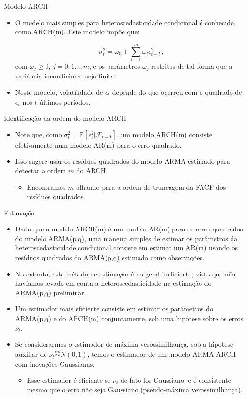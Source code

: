 \documentclass[11pt]{beamer}
\begin{document}
\begin{frame}{Modelo ARCH}
\begin{itemize}
	\item O modelo mais simples para heteroscedasticidade condicional é conhecido como {\color{blue}ARCH(m)}. Este modelo impõe que:
	
	$$\sigma^2_t = \omega_0 +\sum_{l=1}^m \omega_l \epsilon_{t-l}^2 \, ,$$
	com $\omega_j \geq 0$, $j=0,1\ldots, m$, e os parâmetros  $\omega_j$ restritos de tal forma que a variância incondicional seja finita.
	\item Neste modelo, volatilidade de $\epsilon_t$ depende do que ocorreu com o quadrado  de $\epsilon_t$ nos $t$ últimos períodos.
	
\end{itemize}
\end{frame}

\begin{frame}{Identificação da ordem do modelo ARCH}
	\begin{itemize}
		\item Note que, como $\sigma^2_t= \mathbb{E}[\epsilon^2_t|\mathcal{F}_{t-1}]$, um modelo ARCH(m) consiste efetivamente num modelo AR(m) para o erro quadrado.
		\item Isso sugere usar os resíduos quadrados do modelo ARMA estimado para detectar  a ordem $m$ do ARCH.
		\begin{itemize}
			\item Encontramos $m$ olhando para a ordem de truncagem da FACP dos resíduos quadrados.
		\end{itemize}
	\end{itemize}
\end{frame}

\begin{frame}{Estimação}
\begin{itemize}
	\item Dado que o modelo ARCH(m) é um modelo AR(m) para os erros quadrados do modelo ARMA(p,q), uma maneira simples de estimar os parâmetros da heteroscedasticidade condicional consiste em estimar um AR(m) usando os resíduos quadrados do ARMA(p,q) estimado como observações.
	\item No entanto, este método de estimação é no geral ineficiente, visto que não havíamos levado em conta a heteroscedasticidade na estimação do ARMA(p,q) preliminar.
	\item Um estimador mais eficiente consiste em estimar os parâmetros do ARMA(p,q) e do ARCH(m) {\color{blue}conjuntamente}, sob uma hipótese sobre os erros $\nu_t$.
	\item Se considerarmos o estimador de máxima verossimilhança, sob a hipótese auxiliar de $\nu_t \overset{iid}{\sim} N(0,1)$, temos o estimador de um modelo ARMA-ARCH com inovações Gaussianas.
	\begin{itemize}
		\item Esse estimador é eficiente se $\nu_t$ de fato for Gaussiano, e é consistente mesmo que o erro não seja Gaussiano (pseudo-máxima verossimilhança).
	\end{itemize}
\end{itemize}
\end{frame}
\end{document}
